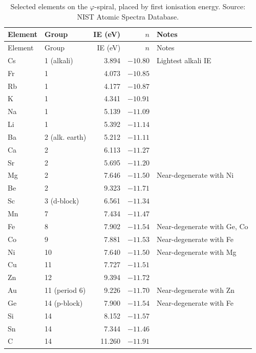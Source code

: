 \documentclass[11pt,a4paper]{article}
\theoremstyle{definition}
\theoremstyle{remark}
\newcommand{\vp}{\varphi}
\begin{document}
\begin{longtable}{llrrp{5cm}}
\caption{Selected elements on the $\vp$-spiral,
  placed by first ionisation energy.
  Source: NIST Atomic Spectra Database.}
\label{P11:tab:elements}\\
\toprule
Element & Group & IE (eV) & $n$ & Notes \\
\midrule
\endfirsthead
\toprule
Element & Group & IE (eV) & $n$ & Notes \\
\midrule
\endhead
\bottomrule
\endfoot
Cs  &  1 (alkali)  &  3.894 & $-10.80$ & Lightest alkali IE \\
Fr  &  1           &  4.073 & $-10.85$ & \\
Rb  &  1           &  4.177 & $-10.87$ & \\
K   &  1           &  4.341 & $-10.91$ & \\
Na  &  1           &  5.139 & $-11.09$ & \\
Li  &  1           &  5.392 & $-11.14$ & \\
\midrule
Ba  &  2 (alk. earth) & 5.212 & $-11.11$ & \\
Ca  &  2              & 6.113 & $-11.27$ & \\
Sr  &  2              & 5.695 & $-11.20$ & \\
Mg  &  2              & 7.646 & $-11.50$ & Near-degenerate with Ni \\
Be  &  2              & 9.323 & $-11.71$ & \\
\midrule
Sc  &  3 (d-block)    & 6.561 & $-11.34$ & \\
Mn  &  7              & 7.434 & $-11.47$ & \\
Fe  &  8              & 7.902 & $-11.54$ & Near-degenerate with Ge, Co \\
Co  &  9              & 7.881 & $-11.53$ & Near-degenerate with Fe \\
Ni  & 10              & 7.640 & $-11.50$ & Near-degenerate with Mg \\
Cu  & 11              & 7.727 & $-11.51$ & \\
Zn  & 12              & 9.394 & $-11.72$ & \\
Au  & 11 (period 6)   & 9.226 & $-11.70$ & Near-degenerate with Zn \\
\midrule
Ge  & 14 (p-block)    & 7.900 & $-11.54$ & Near-degenerate with Fe \\
Si  & 14              & 8.152 & $-11.57$ & \\
Sn  & 14              & 7.344 & $-11.46$ & \\
C   & 14              & 11.260 & $-11.91$ & \\

\end{longtable}
\end{document}
